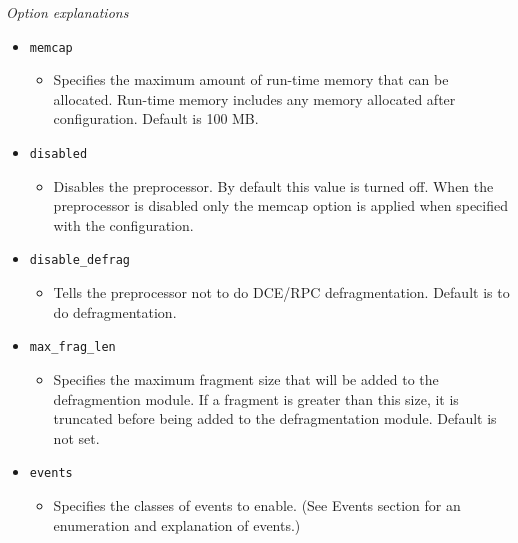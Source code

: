 \documentclass[english]{report}
\begin{document}
\textit{Option explanations}
\begin{itemize}
\item[] \texttt{memcap}
\begin{itemize}

\item[] Specifies the maximum amount of run-time memory that can be allocated.
Run-time memory includes any memory allocated after configuration.  Default is
100 MB.

\end{itemize}

\item[] \texttt{disabled}
\begin{itemize}

\item[] Disables the preprocessor. By default this value is turned off. When the 
preprocessor is disabled only the memcap option is applied when specified 
with the configuration.

\end{itemize}

\item[] \texttt{disable\_defrag}

\begin{itemize}

\item[] Tells the preprocessor not to do DCE/RPC defragmentation.  Default is
to do defragmentation.

\end{itemize}

\item[] \texttt{max\_frag\_len}

\begin{itemize}

\item[] Specifies the maximum fragment size that will be added to the
defragmention module. If a fragment is greater than this size, it is truncated
before being added to the defragmentation module.  Default is not set.

\end{itemize}

\item[] \texttt{events}

\begin{itemize}

\item[] Specifies the classes of events to enable.  (See Events section for an
enumeration and explanation of events.)


\end{itemize}
\end{itemize}
\end{document}
